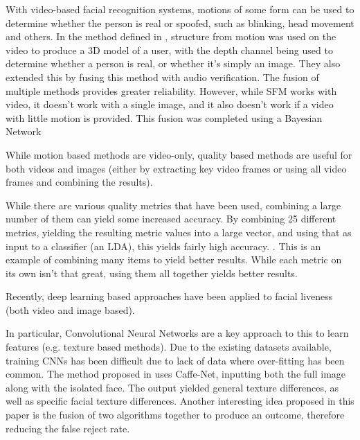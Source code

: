 \documentclass[11pt,a4paper]{article}
\begin{document}
        With video-based facial recognition systems, motions of some form can be used to determine whether the person is real or spoofed, such as blinking, head movement and others.
        In the method defined in \cite{SFMClassifier}, structure from motion was used on the video to produce a 3D model of a user, with the depth channel being used to determine whether a person is real, or whether it's simply an image.
        They also extended this by fusing this method with audio verification. The fusion of multiple methods provides greater reliability. However, while SFM works with video, it doesn't work with a single image,
        and it also doesn't work if a video with little motion is provided. This fusion was completed using a Bayesian Network 

        While motion based methods are video-only, quality based methods are useful for both videos and images (either by extracting key video frames or using all video frames and combining the results).

        While there are various quality metrics that have been used, combining a large number of them can yield some increased accuracy. By combining 25 different metrics,
        yielding the resulting metric values into a large vector, and using that as input to a classifier (an LDA), this yields fairly high accuracy. \cite{ImageQualityAssessmentTest}.
        This is an example of combining many items to yield better results. While each metric on its own isn't that great, using them all together yields better results.
        
        Recently, deep learning based approaches have been applied to facial liveness (both video and image based).

        In particular, Convolutional Neural Networks are a key approach to this to learn features (e.g. texture based methods).
        Due to the existing datasets available, training CNNs has been difficult due to lack of data where over-fitting has been common.
        The method proposed in \cite{Patel2016CrossDatabaseFA} uses Caffe-Net, inputting both the full image along with the isolated face.
        The output yielded general texture differences, as well as specific facial texture differences. Another interesting idea proposed
        in this paper is the fusion of two algorithms together to produce an outcome, therefore reducing the false reject rate.
        
\end{document}
